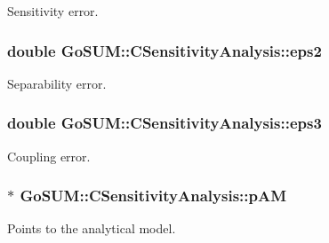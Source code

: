 Sensitivity error. 

\hypertarget{class_go_s_u_m_1_1_c_sensitivity_analysis_ac007c702d7002b57e42cdca9bb40c66c}{
\subsubsection[{eps2}]{\setlength{\rightskip}{0pt plus 5cm}double Go\-S\-U\-M\-::\-C\-Sensitivity\-Analysis\-::eps2\hspace{0.3cm}{\ttfamily [private]}}}\label{class_go_s_u_m_1_1_c_sensitivity_analysis_ac007c702d7002b57e42cdca9bb40c66c}


Separability error. 

\hypertarget{class_go_s_u_m_1_1_c_sensitivity_analysis_a22561f312eacc952b940c5a551bd9fe1}{
\subsubsection[{eps3}]{\setlength{\rightskip}{0pt plus 5cm}double Go\-S\-U\-M\-::\-C\-Sensitivity\-Analysis\-::eps3\hspace{0.3cm}{\ttfamily [private]}}}\label{class_go_s_u_m_1_1_c_sensitivity_analysis_a22561f312eacc952b940c5a551bd9fe1}


Coupling error. 

\hypertarget{class_go_s_u_m_1_1_c_sensitivity_analysis_a5830e671d4f07bf47cf6f5093226589f}{
\subsubsection[{p\-A\-M}]{$\ast$ Go\-S\-U\-M\-::\-C\-Sensitivity\-Analysis\-::p\-A\-M\hspace{0.3cm}{\ttfamily [private]}}}\label{class_go_s_u_m_1_1_c_sensitivity_analysis_a5830e671d4f07bf47cf6f5093226589f}


Points to the analytical model. 


